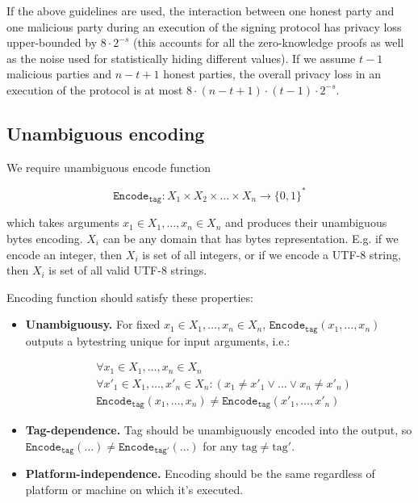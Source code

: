 \documentclass[11pt]{article}
\newcommand{\Encode}[1]{\ensuremath{\mathtt{Encode}_{\mathtt{#1}}}}
\newcommand{\?}[1]{\stackrel{?}{#1}}
\begin{document}
If the above guidelines are used, 
the interaction between one honest party and one malicious party during an execution of the signing protocol has privacy loss upper-bounded by $8 \cdot 2^{-s}$ (this accounts for all the zero-knowledge proofs as well as the noise used for statistically hiding different values). 
If we assume $t-1$ malicious parties and $n-t+1$ honest parties, the overall privacy loss in an execution of the protocol is at most $8\cdot (n-t+1)\cdot (t-1) \cdot 2^{-s}$.

\subsection{Unambiguous encoding}
We require unambiguous encode function 

$$\Encode{tag} : X_1 \times X_2 \times \dots \times X_n \to \{0, 1\}^*$$

which takes arguments $x_1 \in X_1, \dots, x_n \in X_n$ and produces their unambiguous bytes encoding.
$X_i$ can be any domain that has bytes representation. E.g. if we encode an integer, then $X_i$ is set
of all integers, or if we encode a UTF-8 string, then $X_i$ is set of all valid UTF-8 strings.

Encoding function should satisfy these properties:
\begin{itemize}
\item {\bf Unambiguousy.} For fixed $x_1 \in X_1, \dots, x_n \in X_n$, $\Encode{tag}(x_1, \dots, x_n)$
    outputs a bytestring unique for input arguments, i.e.:

    \begin{equation*}
    \begin{split}
    & \forall x_1 \in X_1, \dots, x_n \in X_n \\
    & \forall x'_1 \in X_1, \dots, x'_n \in X_n: (x_1 \ne x'_1 \lor \dots \lor x_n \ne x'_n) \\
    & \Encode{tag}(x_1, \dots, x_n) \ne \Encode{tag}(x'_1, \dots, x'_n)
    \end{split}
    \end{equation*}
\item {\bf Tag-dependence.} Tag should be unambiguously encoded into the output, so
    $\Encode{tag}(\dots) \ne \Encode{tag'}(\dots)$ for any $\text{tag} \ne \text{tag}'$. 
\item {\bf Platform-independence.} Encoding should be the same regardless of platform or machine on which it's
    executed.
\end{itemize}
\end{document}
